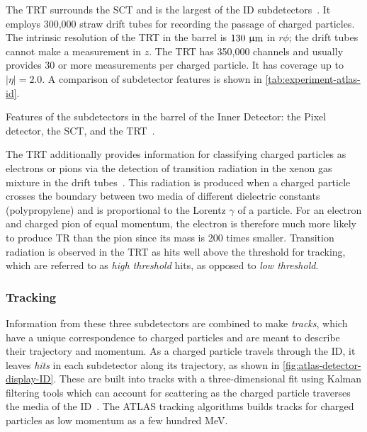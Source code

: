 The TRT surrounds the SCT and is the largest of the ID subdetectors~\cite{cern-jinst-atlas}. It employs 300,000 straw drift tubes for recording the passage of charged particles. The intrinsic resolution of the TRT in the barrel is $130\ \micron$ in $r\phi$; the drift tubes cannot make a measurement in $z$. The TRT has 350,000 channels and usually provides 30 or more measurements per charged particle. It has coverage up to $|\eta|=2.0$. A comparison of subdetector features is shown in \cref{tab:experiment-atlas-id}.

\begin{table}[bp]
  \centering
  \renewcommand{\arraystretch}{1.2}
  \caption{Features of the subdetectors in the barrel of the Inner Detector: the Pixel detector, the SCT, and the TRT~\cite{ATLAS-CONF-2014-047}.}
  
  \label{tab:experiment-atlas-id}
\end{table}

The TRT additionally provides information for classifying charged particles as electrons or pions via the detection of transition radiation in the xenon gas mixture in the drift tubes~\cite{ATLAS-CONF-2011-128}. This radiation is produced when a charged particle crosses the boundary between two media of different dielectric constants (polypropylene) and is proportional to the Lorentz $\gamma$ of a particle. For an electron and charged pion of equal momentum, the electron is therefore much more likely to produce TR than the pion since its mass is 200 times smaller. Transition radiation is observed in the TRT as hits well above the threshold for tracking, which are referred to as \textit{high threshold} hits, as opposed to \textit{low threshold}.

\subsubsection{Tracking}

Information from these three subdetectors are combined to make \textit{tracks}, which have a unique correspondence to charged particles and are meant to describe their trajectory and momentum. As a charged particle travels through the ID, it leaves \textit{hits} in each subdetector along its trajectory, as shown in \cref{fig:atlas-detector-display-ID}. These are built into tracks with a three-dimensional fit using Kalman filtering tools which can account for scattering as the charged particle traverses the media of the ID~\cite{ATLAS-CONF-2014-047,ATLAS-CONF-2012-042}. The ATLAS tracking algorithms builds tracks for charged particles as low momentum as a few hundred MeV.

